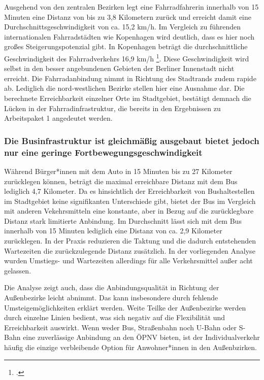 
Ausgehend von den zentralen Bezirken legt eine Fahrradfahrerin innerhalb von 15 Minuten eine Distanz von bis zu 3,8 Kilometern zurück und erreicht damit eine Durchschnittsgeschwindigkeit von ca. 15,2 km/h. Im Vergleich zu führenden internationalen Fahrradstädten wie Kopenhagen wird deutlich, dass es hier noch großes Steigerungspotenzial gibt. In Kopenhagen beträgt die durchschnittliche Geschwindigkeit des Fahrradverkehrs 16,9 km/h \footcite{kopenhagen}.
Diese Geschwindigkeit wird selbst in den besser angebundenen Gebieten der Berliner Innenstadt nicht erreicht. Die Fahrradanbindung nimmt in Richtung des Stadtrands zudem rapide ab. Lediglich die nord-westlichen Bezirke stellen hier eine Ausnahme dar. Die berechnete Erreichbarkeit einzelner Orte im Stadtgebiet, bestätigt demnach die Lücken in der Fahrradinfrastruktur, die bereits in den Ergebnissen zu Arbeitspaket 1 angedeutet werden. 

\subsubsection{Die Businfrastruktur ist gleichmäßig ausgebaut bietet jedoch nur eine geringe Fortbewegungsgeschwindigkeit}
Während Bürger*innen mit dem Auto in 15 Minuten bis zu 27 Kilometer zurücklegen können, beträgt die maximal erreichbare Distanz mit dem Bus lediglich 4,7 Kilometer. Da es hinsichtlich der Erreichbarkeit von Bushaltestellen im Stadtgebiet keine signifikanten Unterschiede gibt, bietet der Bus im Vergleich mit anderen Vekehrsmitteln eine konstante, aber in Bezug auf die zurücklegbare Distanz stark limitierte Anbindung. Im Durchschnitt lässt sich mit dem Bus innerhalb von 15 Minuten lediglich eine Distanz von ca. 2,9 Kilometer zurücklegen. In der Praxis reduzieren die Taktung und die dadurch entstehenden Wartezeiten die zurückzulegende Distanz zusätzlich. In der vorliegenden Analyse wurden Umstiegs- und Wartezeiten allerdings für alle Verkehrsmittel außer acht gelassen. 


Die Analyse zeigt auch, dass die Anbindungsqualität in Richtung der Außenbezirke leicht abnimmt. Das kann insbesondere durch fehlende Umsteigemöglichkeiten erklärt werden. Weite Teilke der Außenbezirke werden durch einzelne Linien bedient, was sich negativ auf die Flexibilität und Erreichbarkeit auswirkt. Wenn weder Bus, Straßenbahn noch U-Bahn oder S-Bahn eine zuverlässige Anbindung an den ÖPNV bieten, ist der Individualverkehr häufig die einzige verbleibende Option für Anwohner*innen in den Außenbzirken.

